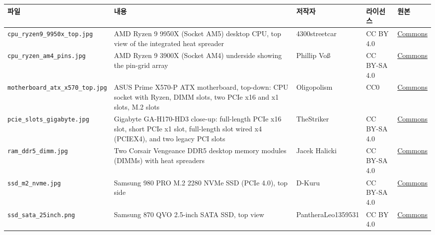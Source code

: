 {\scriptsize
\begin{longtable}{@{}>{\raggedright\arraybackslash}p{36mm}>{\raggedright\arraybackslash}p{56mm}>{\raggedright\arraybackslash}p{26mm}>{\raggedright\arraybackslash}p{15mm}l@{}}
\toprule
파일 & 내용 & 저작자 & 라이선스 & 원본 \\
\midrule
\endhead
\bottomrule
\endfoot
\texttt{cpu\_\allowbreak{}ryzen9\_\allowbreak{}9950x\_\allowbreak{}top.jpg} &AMD Ryzen 9 9950X (Socket AM5) desktop CPU, top view of the integrated heat spreader & 4300streetcar & CC BY 4.0 & \href{https://commons.wikimedia.org/wiki/File:AMD_Ryzen_9_9950X_2.jpg}{Commons} \\
\texttt{cpu\_\allowbreak{}ryzen\_\allowbreak{}am4\_\allowbreak{}pins.jpg} &AMD Ryzen 9 3900X (Socket AM4) underside showing the pin-grid array & Phillip Voß & CC BY-SA 4.0 & \href{https://commons.wikimedia.org/wiki/File:AMD_Ryzen_9_3900X_-_ISO_Back.jpg}{Commons} \\
\texttt{motherboard\_\allowbreak{}atx\_\allowbreak{}x570\_\allowbreak{}top.jpg} &ASUS Prime X570-P ATX motherboard, top-down: CPU socket with Ryzen, DIMM slots, two PCIe x16 and x1 slots, M.2 slots & Oligopolism & CC0 & \href{https://commons.wikimedia.org/wiki/File:ASUS_Prime_X570-P_(1).jpg}{Commons} \\
\texttt{pcie\_\allowbreak{}slots\_\allowbreak{}gigabyte.jpg} &Gigabyte GA-H170-HD3 close-up: full-length PCIe x16 slot, short PCIe x1 slot, full-length slot wired x4 (PCIEX4), and two legacy PCI slots & TheStriker & CC BY-SA 4.0 & \href{https://commons.wikimedia.org/wiki/File:GigabyteH170-HD3-PCH-and-Slots.jpg}{Commons} \\
\texttt{ram\_\allowbreak{}ddr5\_\allowbreak{}dimm.jpg} &Two Corsair Vengeance DDR5 desktop memory modules (DIMMs) with heat spreaders & Jacek Halicki & CC BY-SA 4.0 & \href{https://commons.wikimedia.org/wiki/File:2023_Pami\%C4\%99ci_Corsair_Vengeance_RGB.jpg}{Commons} \\
\texttt{ssd\_\allowbreak{}m2\_\allowbreak{}nvme.jpg} &Samsung 980 PRO M.2 2280 NVMe SSD (PCIe 4.0), top side & D-Kuru & CC BY-SA 4.0 & \href{https://commons.wikimedia.org/wiki/File:Samsung_980_PRO_PCIe_4.0_NVMe_SSD_1TB-top_PNr\%C2\%B00915.jpg}{Commons} \\
\texttt{ssd\_\allowbreak{}sata\_\allowbreak{}25inch.png} &Samsung 870 QVO 2.5-inch SATA SSD, top view & PantheraLeo1359531 & CC BY 4.0 & \href{https://commons.wikimedia.org/wiki/File:Samsung_870_QVO_8TB_SATA_2,5_Zoll_Internes_Solid_State_Drive_(SSD)_(MZ-77Q8T0BW)_20211008_SSD023_corr.png}{Commons} \\

\end{longtable}}
